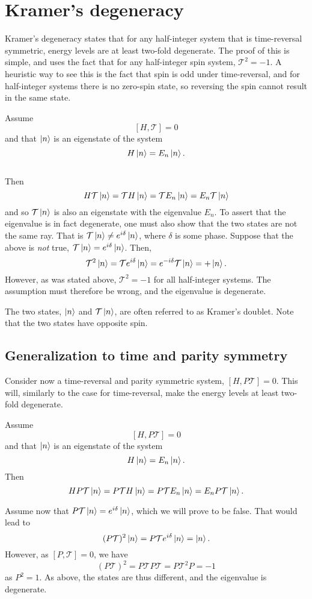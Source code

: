 \section{Kramer's degeneracy}


Kramer's degeneracy states that for any half-integer system that is time-reversal symmetric, energy levels are at least two-fold degenerate.
The proof of this is simple, and uses the fact that for any half-integer spin system, $\mathcal{T}^2 = -1$.
A heuristic way to see this is the fact that spin is odd under time-reversal, and for half-integer systems there is no zero-spin state, so reversing the spin cannot result in the same state.
\begin{Proof}
  Assume
  $$ [H, \mathcal{T}] = 0 $$
  and that $\ket{n}$ is an eigenstate of the system
  $$ H \ket{n} = E_n \ket{n}.$$\\
  Then
  $$
  H \mathcal{T} \ket{n} = \mathcal{T} H \ket{n} = \mathcal{T} E_n \ket{n} = E_n \mathcal{T} \ket{n}
  $$
  and so $\mathcal{T} \ket{n}$ is also an eigenstate with the eigenvalue $E_n$.
  To assert that the eigenvalue is in fact degenerate, one must also show that the two states are not the same ray.
  That is $\mathcal{T} \ket{n} \neq e^{i \delta} \ket{n}$, where $\delta$ is some phase.
  Suppose that the above is \emph{not} true, $\mathcal{T} \ket{n} = e^{i \delta} \ket{n}$.
  Then,
  $$
  \mathcal{T}^2 \ket{n} = \mathcal{T} e^{i\delta} \ket{n} = e^{-i\delta} \mathcal{T} \ket{n} = + \ket{n}.
  $$
  However, as was stated above, $\mathcal{T}^2 = -1$ for all half-integer systems.
  The assumption must therefore be wrong, and the eigenvalue is degenerate.
\end{Proof}
The two states, $\ket{n}$ and $\mathcal{T} \ket{n}$, are often referred to as Kramer's doublet.
Note that the two states have opposite spin.

\subsection{Generalization to time and parity symmetry}
Consider now a time-reversal and parity symmetric system, $[H, P \mathcal{T}] = 0$.
This will, similarly to the case for time-reversal, make the energy levels at least two-fold degenerate.
\begin{Proof}
  Assume
  $$
  [H,P \mathcal{T}] = 0
  $$
  and that $\ket{n}$ is an eigenstate of the system
  $$
  H\ket{n} = E_n\ket{n}.
  $$
  Then
  $$
  H P \mathcal{T}\ket{n} =
  P\mathcal{T} H \ket{n} =
  P \mathcal{T} E_n \ket{n} =
  E_n P\mathcal{T} \ket{n}.
  $$

  Assume now that $P\mathcal{T} \ket{n} = e^{i\delta} \ket{n}$, which we will prove to be false.
  That would lead to
  $$
  (P\mathcal{T})^2 \ket{n} = P\mathcal{T} e^{i\delta} \ket{n}
  = \ket{n}.
  $$
  However, as $[P, \mathcal{T}] = 0$, we have
  $$
  (P\mathcal{T})^2 =
  P\mathcal{T} P \mathcal{T}=
  P\mathcal{T}^2 P=
  -1
  $$
  as $P^2 = 1$.
  As above, the states are thus different, and the eigenvalue is degenerate.
\end{Proof}
